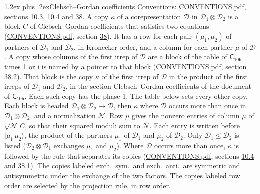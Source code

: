 \documentclass[10pt,a4paper]{article}
\makeatletter
\renewcommand\section{\@startsection{section}{1}{\z@}{-3ex plus -1ex minus -.2ex}%
  {1.2ex plus .2ex}{\normalfont\large\sffamily\bfseries\color{parttitle}}}
\numberwithin{equation}{section}
\newcommand{\grp}[1]{\mathsf{#1}}
\newcommand{\iunit}{\mathrm{i}}
\newcommand{\irrprod}{\otimes}
\newcommand{\mult}{\kappa}
\newcommand{\intx}{\mu}
\newcommand{\cgnorm}{\mathcal{N}}
\newcommand{\prodket}[2]{\lvert {#1}\,{#2}\rangle}
\makeatother
\begin{document}
\section{Clebsch--Gordan coefficients}\label{s:clebsch_gordan}
Conventions: \href{../../CONVENTIONS.pdf}{CONVENTIONS.pdf}, sections \href{../../../rotation/CONVENTIONS.pdf\#conv.10.3}{10.3}, \href{../../../rotation/CONVENTIONS.pdf\#conv.10.4}{10.4} and \href{../../CONVENTIONS.pdf\#conv.38}{38}.
\leavevmode\label{n:index.copy}\label{n:matrix.cg.stored}A copy $\mult$ of a corepresentation $\mathcal{D}$ in $\mathcal{D}_1\irrprod\mathcal{D}_2$ is a block $C$ of Clebsch--Gordan coefficients that satisfies two equations (\href{../../CONVENTIONS.pdf}{CONVENTIONS.pdf}, section \href{../../CONVENTIONS.pdf\#conv.38}{38}). \label{n:index.cg}It has a row for each pair $(\intx_1, \intx_2)$ of partners of $\mathcal{D}_1$ and $\mathcal{D}_2$, in Kronecker order, and a column for each partner $\intx$ of $\mathcal{D}$.
A copy whose columns of the first irrep of $\mathcal{D}$ are a block of the table of $\grp{C_{10h}}$ times 1 or $\iunit$ is named by a pointer to that block (\href{../../CONVENTIONS.pdf}{CONVENTIONS.pdf}, section \href{../../CONVENTIONS.pdf\#conv.38.2}{38.2}). That block is the copy $\mult$ of the first irrep of $\mathcal{D}$ in the product of the first irreps of $\mathcal{D}_1$ and $\mathcal{D}_2$, in the section Clebsch--Gordan coefficients of the document of \href{../../../rotation/data/pdf/C10h.pdf}{$\grp{C_{10h}}$}. Each such copy has the phase 1. The table below sets every other copy.
Each block is headed $\mathcal{D}_1\irrprod\mathcal{D}_2\to\mathcal{D}$, then $\mult$ where $\mathcal{D}$ occurs more than once in $\mathcal{D}_1\irrprod\mathcal{D}_2$, and a normalization $\cgnorm$. Row $\intx$ gives the nonzero entries of column $\intx$ of $\sqrt{\cgnorm}\,C$, so that their squared moduli sum to $\cgnorm$. \label{n:vector.ket.product}Each entry is written before $\prodket{\intx_1}{\intx_2}$, the product of the partners $\intx_1$ of $\mathcal{D}_1$ and $\intx_2$ of $\mathcal{D}_2$. Only $\mathcal{D}_1 \le \mathcal{D}_2$ is listed ($\mathcal{D}_2\irrprod\mathcal{D}_1$ exchanges $\intx_1$ and $\intx_2$).
Where $\mathcal{D}$ occurs more than once, $\mult$ is followed by the rule that separates its copies (\href{../../CONVENTIONS.pdf}{CONVENTIONS.pdf}, sections \href{../../../rotation/CONVENTIONS.pdf\#conv.10.4}{10.4} and \href{../../CONVENTIONS.pdf\#conv.38.1}{38.1}). \label{n:abbreviation.exchange}The copies labeled exch.\ sym.\ and exch.\ anti.\ are symmetric and antisymmetric under the exchange of the two factors. The copies labeled row order are selected by the projection rule, in row order.
\end{document}
